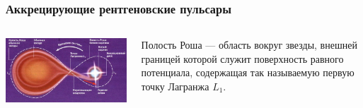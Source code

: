 \documentclass[10pt, pdf, hyperref={unicode}]{beamer}
\begin{document}
	\begin{frame}
		
		\frametitle{Аккрецирующие рентгеновские пульсары}
		
		\begin{columns}[T]
			
			\begin{column}{0.7\textwidth}
				\includegraphics[width=\textwidth]{roche_lobe}
			\end{column}
			
			\begin{column}{0.3\textwidth}
				Полость Роша ---  область вокруг звезды, внешней границей которой служит поверхность равного потенциала, содержащая так называемую первую точку Лагранжа $L_{1}$.
			\end{column}
			
		\end{columns}
		
	\end{frame}
\end{document}
